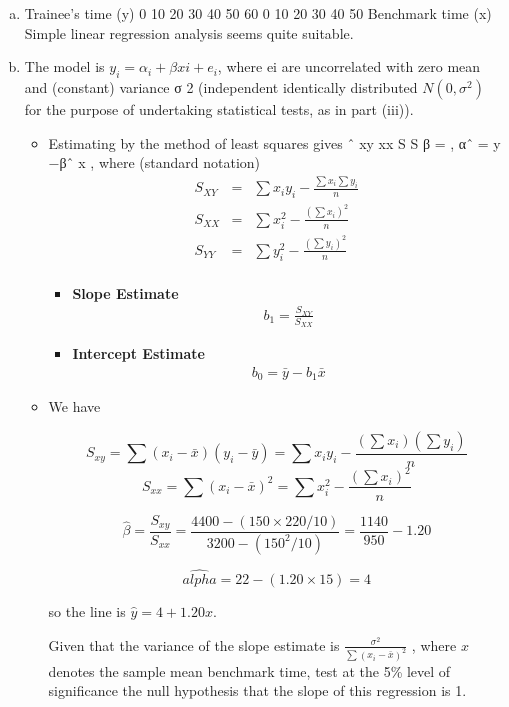\documentclass[a4paper,12pt]{article}
\begin{document}
\begin{enumerate}[(a)]
\item Trainee's time (y)
0
10
20
30
40
50
60
0 10 20 30 40 50
Benchmark time (x)
Simple linear regression analysis seems quite suitable.
\item  The model is $y_i = \alpha_i + \beta xi + e_i$, where {ei} are uncorrelated with zero mean and
(constant) variance σ 2 (independent identically distributed $N(0, \sigma^2)$ for the purpose of
undertaking statistical tests, as in part (iii)). \begin{itemize}
\item Estimating by the method of least squares
gives
ˆ xy
xx
S
S
β = , αˆ = y −βˆ x ,
where (standard notation)
\begin{eqnarray*}
S_{XY} &=&
\sum x_iy_i - \frac{\sum x_i\sum y_i}{n}\\
S_{XX} &=&
\sum x_i^2 - \frac{(\sum x_i)^2}{n}\\
S_{YY} &=&
\sum y_i^2 - \frac{(\sum y_i)^2}{n}\\
\end{eqnarray*}
\begin{itemize}
\item \textbf{ Slope Estimate}
\begin{eqnarray*}
b_1 = \frac{S_{XY}}{S_{XX}}
\end{eqnarray*}
\item \textbf{ Intercept Estimate}
\begin{eqnarray*}
 b_0 = \bar{y} -b_1\bar{x}
\end{eqnarray*}
\end{itemize}
\item We have

\[S_{xy} = \sum(x_i - \bar{x})(y_i - \bar{y})  = \sum x_iy_i - \frac{(\sum x_i)(\sum y_i)}{n}\]
\[S_{xx} = \sum(x_i - \bar{x})^2 = \sum x^2_i - \frac{(\sum x_i)^2}{n}\]

\[ \hat{\beta}  = \frac{S_{xy}}{S_{xx}} = \frac{4400 - (150 \times 220/10)}{3200-(150^2/10)}
= \frac{1140}{950} - 1.20\]

\[\hat{alpha} = 22 -(1.20 \times 15) = 4\]

so the line is $\hat{y} = 4 + 1.20 x$.


Given that the variance of the slope estimate is ${ \displaystyle \frac{\sigma^2}{\sum( x_i - \bar{x} )^2}  }$
 , where $x$ denotes
the sample mean benchmark time, test at the 5\% level of significance the null
hypothesis that the slope of this regression is 1.


\end{itemize}
\end{enumerate}
\end{document}
